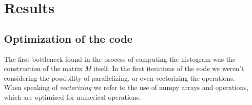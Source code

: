 \clearpage\section{Results}




% 

\subsection{Optimization of the code}

The first bottleneck found in the process of computing the histogram was the construction of the matrix $M$ itself. In the first iterations of the code we weren't considering the possibility of parallelizing, or even vectorizing the operations. When speaking of \textit{vectorizing} we refer to the use of numpy arrays and operations, which are optimized for numerical operations.


